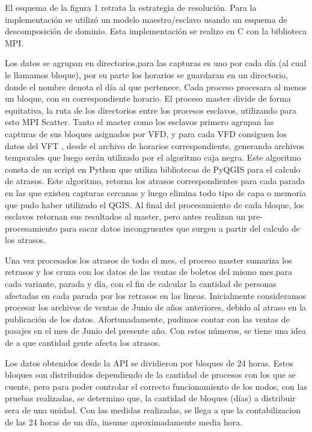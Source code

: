 \documentclass[journal]{IEEEtran}
\begin{document}
El esquema de la figura 1 retrata la estrategia de resolución. Para la implementación se utilizó un modelo maestro/esclavo usando un esquema de descomposición de dominio. Esta implementación se realizo en C con la biblioteca MPI.

Los datos se agrupan en directorios,para las capturas es uno por cada día (al cual le llamamos bloque), por su parte los horarios se guardaran en un directorio, donde el nombre denota el día al que pertenece. Cada proceso procesara al menos un bloque, con su correspondiente horario. El proceso master divide de forma equitativa, la ruta de los directorios entre los procesos esclavos, utilizando para esto MPI Scatter.
Tanto el master como los esclavos primero agrupan las capturas de sus bloques asignados por VFD, y para cada VFD consiguen los datos del VFT , desde el archivo de horarios correspondiente, generando archivos temporales que luego serán utilizado por el algoritmo caja negra. Este algoritmo consta de un script en Python que utiliza bibliotecas de PyQGIS para el calculo de atrasos. Este algoritmo, retorna los atrasos correspondientes para cada parada en las que existen capturas cercanas y luego elimina todo tipo de capa o memoria que pudo haber utilizado el QGIS.
Al final del procesamiento de cada bloque, los esclavos retornan sus resultados al master, pero antes realizan un pre-procesamiento para sacar datos incongruentes que surgen a partir del calculo de los atrasos. 

Una vez procesados los atrasos de todo el mes, el proceso master sumariza los retrasos y los cruza con los datos de las ventas de boletos del mismo mes,para cada variante, parada y día, con el fin de calcular la cantidad de personas afectadas en cada parada por los retrasos en las lineas. Inicialmente consideramos procesar los archivos de ventas de Junio de años anteriores, debido al atraso en la publicación de los datos. Afortunadamente, pudimos contar con las ventas de pasajes en el mes de Junio del presente año. Con estos números, se tiene una idea de a que cantidad gente afecta los atrasos.

Los datos obtenidos desde la API se dividieron por bloques de 24 horas. Estos bloques son distribuidos dependiendo de la cantidad de procesos con los que se cuente, pero para poder controlar el correcto funcionamiento de los nodos, con las pruebas realizadas, se determino que, la cantidad de bloques (días) a distribuir sera de una unidad. Con las medidas realizadas, se llega a que la contabilizacion de las 24 horas de un día, insume aproximadamente media hora.
\end{document}
